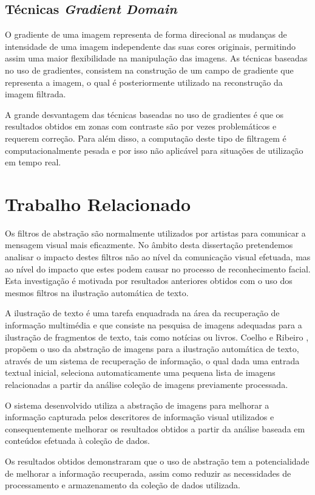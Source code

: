 \subsection{Técnicas \textit{Gradient Domain}}
O gradiente de uma imagem representa de forma direcional as mudanças de intensidade de uma imagem independente das suas cores originais, permitindo assim uma maior flexibilidade na manipulação das imagens. As técnicas baseadas no uso de gradientes, consistem na construção de um campo de gradiente que representa a imagem, o qual é posteriormente utilizado na reconstrução da imagem filtrada.

A grande desvantagem das técnicas baseadas no uso de gradientes é que os resultados obtidos em zonas com contraste são por vezes problemáticos e requerem correção. Para além disso, a computação deste tipo de filtragem é computacionalmente pesada e por isso não aplicável para situações de utilização em tempo real.

\section{Trabalho Relacionado}
Os filtros de abstração são normalmente utilizados por artistas para comunicar a mensagem visual mais eficazmente.  No âmbito desta dissertação pretendemos analisar o impacto destes filtros não ao nível da comunicação visual efetuada, mas ao nível do impacto que estes podem causar no processo de reconhecimento facial. Esta investigação é motivada por resultados anteriores obtidos com o uso dos mesmos filtros na ilustração automática de texto.

A ilustração de texto é uma tarefa enquadrada na área da recuperação de informação multimédia e que consiste na pesquisa de imagens adequadas para a ilustração de fragmentos de texto, tais como notícias ou livros. Coelho e Ribeiro  \cite{Coelho:2012:IAC:2260641.2260676}, propõem o uso da abstração de imagens para a ilustração automática de texto, através de um sistema de recuperação de informação, o qual dada uma entrada textual inicial, seleciona automaticamente uma pequena lista de imagens relacionadas a partir da análise coleção de imagens previamente processada.

O sistema desenvolvido utiliza a abstração de imagens para melhorar a informação capturada pelos descritores de informação visual utilizados e consequentemente melhorar os resultados obtidos a partir da análise baseada em conteúdos efetuada à coleção de dados.

Os resultados obtidos demonstraram que o uso de abstração tem a potencialidade de melhorar a informação recuperada, assim como reduzir as necessidades de processamento e armazenamento da coleção de dados utilizada.